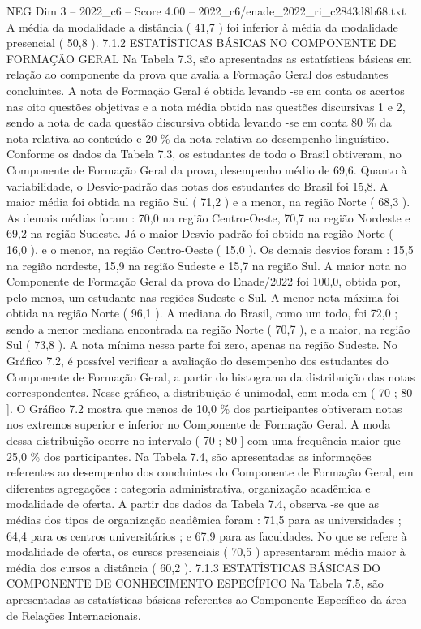 \begin{textsample}{NEG Dim 3 – 2022\_c6 – Score 4.00 – 2022\_c6/enade\_2022\_ri\_c2843d8b68.txt}
A média da modalidade a distância ( 41,7 ) foi inferior à média da modalidade presencial ( 50,8 ). 7.1.2 ESTATÍSTICAS BÁSICAS NO COMPONENTE DE FORMAÇÃO GERAL Na Tabela 7.3, são apresentadas as estatísticas básicas em relação ao componente da prova que avalia a Formação Geral dos estudantes concluintes.
A nota de Formação Geral é obtida levando -se em conta os acertos nas oito questões objetivas e a nota média obtida nas questões discursivas 1 e 2, sendo a nota de cada questão discursiva obtida levando -se em conta 80 \% da nota relativa ao conteúdo e 20 \% da nota relativa ao desempenho linguístico.
Conforme os dados da Tabela 7.3, os estudantes de todo o Brasil obtiveram, no Componente de Formação Geral da prova, desempenho médio de 69,6.
Quanto à variabilidade, o Desvio-padrão das notas dos estudantes do Brasil foi 15,8.
A maior média foi obtida na região Sul ( 71,2 ) e a menor, na região Norte ( 68,3 ).
As demais médias foram : 70,0 na região Centro-Oeste, 70,7 na região Nordeste e 69,2 na região Sudeste.
Já o maior Desvio-padrão foi obtido na região Norte ( 16,0 ), e o menor, na região Centro-Oeste ( 15,0 ).
Os demais desvios foram : 15,5 na região nordeste, 15,9 na região Sudeste e 15,7 na região Sul.
A maior nota no Componente de Formação Geral da prova do Enade/2022 foi 100,0, obtida por, pelo menos, um estudante nas regiões Sudeste e Sul.
A menor nota máxima foi obtida na região Norte ( 96,1 ).
A mediana do Brasil, como um todo, foi 72,0 ; sendo a menor mediana encontrada na região Norte ( 70,7 ), e a maior, na região Sul ( 73,8 ).
A nota mínima nessa parte foi zero, apenas na região Sudeste.
No Gráfico 7.2, é possível verificar a avaliação do desempenho dos estudantes do Componente de Formação Geral, a partir do histograma da distribuição das notas correspondentes.
Nesse gráfico, a distribuição é unimodal, com moda em ( 70 ; 80 ].
O Gráfico 7.2 mostra que menos de 10,0 \% dos participantes obtiveram notas nos extremos superior e inferior no Componente de Formação Geral.
A moda dessa distribuição ocorre no intervalo ( 70 ; 80 ] com uma frequência maior que 25,0 \% dos participantes.
Na Tabela 7.4, são apresentadas as informações referentes ao desempenho dos concluintes do Componente de Formação Geral, em diferentes agregações : categoria administrativa, organização acadêmica e modalidade de oferta.
A partir dos dados da Tabela 7.4, observa -se que as médias dos tipos de organização acadêmica foram : 71,5 para as universidades ; 64,4 para os centros universitários ; e 67,9 para as faculdades.
No que se refere à modalidade de oferta, os cursos presenciais ( 70,5 ) apresentaram média maior à média dos cursos a distância ( 60,2 ). 7.1.3 ESTATÍSTICAS BÁSICAS DO COMPONENTE DE CONHECIMENTO ESPECÍFICO Na Tabela 7.5, são apresentadas as estatísticas básicas referentes ao Componente Específico da área de Relações Internacionais.

\end{textsample}
